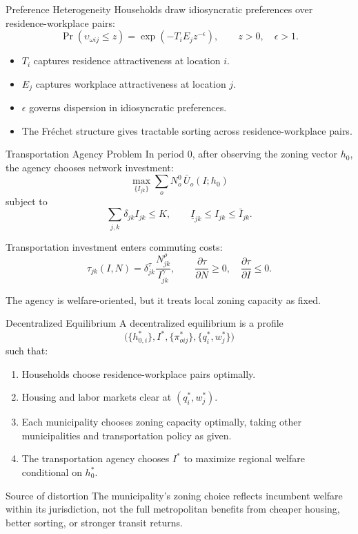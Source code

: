 \documentclass[10pt]{beamer}
\begin{document}
\begin{frame}{Preference Heterogeneity}
Households draw idiosyncratic preferences over residence-workplace pairs:
\[
\Pr(\upsilon_{\omega ij} \leq z)
=
\exp\!\left(-T_iE_jz^{-\epsilon}\right),
\qquad
z>0,\quad \epsilon>1.
\]

\vspace{0.25cm}
\begin{itemize}
    \item $T_i$ captures residence attractiveness at location $i$.
    \item $E_j$ captures workplace attractiveness at location $j$.
    \item $\epsilon$ governs dispersion in idiosyncratic preferences.
    \item The Fréchet structure gives tractable sorting across residence-workplace pairs.
\end{itemize}

\vspace{0.25cm}
\end{frame}

\begin{frame}{Transportation Agency Problem}
In period 0, after observing the zoning vector $h_0$, the agency chooses network investment:
\[
\max_{\{I_{jk}\}}
\sum_o N_o^0\,\bar U_o(I;h_0)
\]
subject to
\[
\sum_{j,k}\delta_{jk}I_{jk}\leq K,
\qquad
\underline I_{jk}\leq I_{jk}\leq \bar I_{jk}.
\]

\vspace{0.25cm}
Transportation investment enters commuting costs:
\[
\tau_{jk}(I,N)
=
\delta^\tau_{jk}\frac{N_{jk}^{\rho}}{I_{jk}^{\gamma}},
\qquad
\frac{\partial \tau}{\partial N}\geq 0,
\quad
\frac{\partial \tau}{\partial I}\leq 0.
\]

\vspace{0.2cm}
The agency is welfare-oriented, but it treats local zoning capacity as fixed.
\end{frame}

\begin{frame}{Decentralized Equilibrium}
A decentralized equilibrium is a profile
\[
\bigl(
\{h_{0,i}^*\},
I^*,
\{\pi_{oij}^*\},
\{q_i^*,w_j^*\}
\bigr)
\]
such that:
\begin{enumerate}
    \item Households choose residence-workplace pairs optimally.
    \item Housing and labor markets clear at $(q_i^*,w_j^*)$.
    \item Each municipality chooses zoning capacity optimally, taking other municipalities and transportation policy as given.
    \item The transportation agency chooses $I^*$ to maximize regional welfare conditional on $h_0^*$.
\end{enumerate}

\vspace{0.25cm}
\begin{block}{Source of distortion}
The municipality's zoning choice reflects incumbent welfare within its jurisdiction, not the full metropolitan benefits from cheaper housing, better sorting, or stronger transit returns.
\end{block}
\end{frame}
\end{document}
